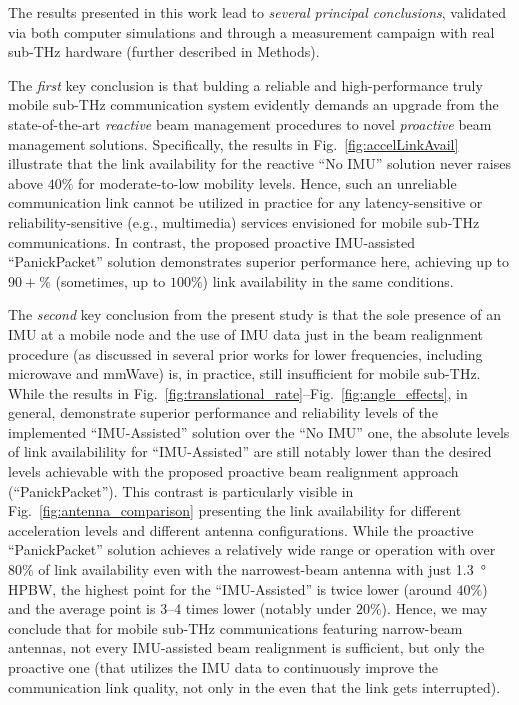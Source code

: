 \documentclass[fleqn,10pt]{wlscirep}
\begin{document}
The results presented in this work lead to \emph{several principal conclusions}, validated via both computer simulations and through a measurement campaign with real sub-THz hardware (further described in Methods).

The \emph{first} key conclusion is that bulding a reliable and high-performance truly mobile sub-THz communication system evidently demands an upgrade from the state-of-the-art \emph{reactive} beam management procedures to novel \emph{proactive} beam management solutions. Specifically, the results in Fig.~\ref{fig:accelLinkAvail} illustrate that the link availability for the reactive ``No IMU'' solution never raises above $40\%$ for moderate-to-low mobility levels. Hence, such an unreliable communication link cannot be utilized in practice for any latency-sensitive or reliability-sensitive (e.g., multimedia) services envisioned for mobile sub-THz communications. In contrast, the proposed proactive IMU-assisted ``PanickPacket'' solution demonstrates superior performance here, achieving up to $90+\%$ (sometimes, up to $100\%$) link availability in the same conditions.


The \emph{second} key conclusion from the present study is that the sole presence of an IMU at a mobile node and the use of IMU data just in the beam realignment procedure (as discussed in several prior works for lower frequencies, including microwave and mmWave) is, in practice, still insufficient for mobile sub-THz. While the results in Fig.~\ref{fig:translational_rate}--Fig.~\ref{fig:angle_effects}, in general, demonstrate superior performance and reliability levels of the implemented ``IMU-Assisted'' solution over the ``No IMU'' one, the absolute levels of link availabilility for ``IMU-Assisted'' are still notably lower than the desired levels achievable with the proposed proactive beam realignment approach (``PanickPacket''). This contrast is particularly visible in Fig.~\ref{fig:antenna_comparison} presenting the link availability for different acceleration levels and different antenna configurations. While the proactive ``PanickPacket'' solution achieves a relatively wide range or operation with over $80\%$ of link availability even with the narrowest-beam antenna with just \SI{1.3}{\degree} HPBW, the highest point for the ``IMU-Assisted'' is twice lower (around $40\%$) and the average point is 3--4 times lower (notably under $20\%$). Hence, we may conclude that for mobile sub-THz communications featuring narrow-beam antennas, not every IMU-assisted beam realignment is sufficient, but only the proactive one (that utilizes the IMU data to continuously improve the communication link quality, not only in the even that the link gets interrupted).
\end{document}

